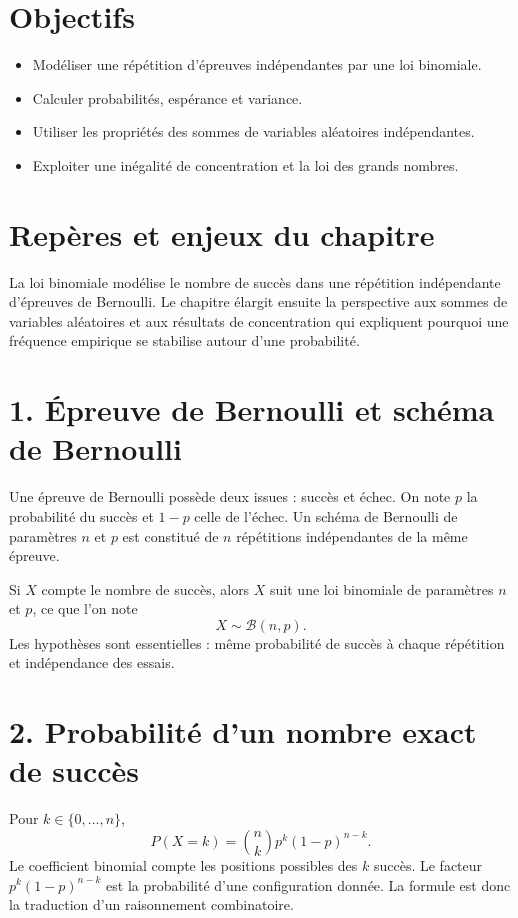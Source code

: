 
\section{Objectifs}
\begin{itemize}
\item Modéliser une répétition d’épreuves indépendantes par une loi binomiale.
\item Calculer probabilités, espérance et variance.
\item Utiliser les propriétés des sommes de variables aléatoires indépendantes.
\item Exploiter une inégalité de concentration et la loi des grands nombres.
\end{itemize}

\section{Repères et enjeux du chapitre}
La loi binomiale modélise le nombre de succès dans une répétition indépendante d’épreuves de Bernoulli. Le chapitre élargit ensuite la perspective aux sommes de variables aléatoires et aux résultats de concentration qui expliquent pourquoi une fréquence empirique se stabilise autour d’une probabilité.

\section{1. Épreuve de Bernoulli et schéma de Bernoulli}
Une épreuve de Bernoulli possède deux issues : succès et échec. On note $p$ la probabilité du succès et $1-p$ celle de l’échec. Un schéma de Bernoulli de paramètres $n$ et $p$ est constitué de $n$ répétitions indépendantes de la même épreuve.

Si $X$ compte le nombre de succès, alors $X$ suit une loi binomiale de paramètres $n$ et $p$, ce que l’on note
\[
X\sim\mathcal{B}(n,p).
\]
Les hypothèses sont essentielles : même probabilité de succès à chaque répétition et indépendance des essais.

\section{2. Probabilité d’un nombre exact de succès}
Pour $k\in\{0,\ldots,n\}$,
\[
P(X=k)=\binom nk p^k(1-p)^{n-k}.
\]
Le coefficient binomial compte les positions possibles des $k$ succès. Le facteur $p^k(1-p)^{n-k}$ est la probabilité d’une configuration donnée. La formule est donc la traduction d’un raisonnement combinatoire.

